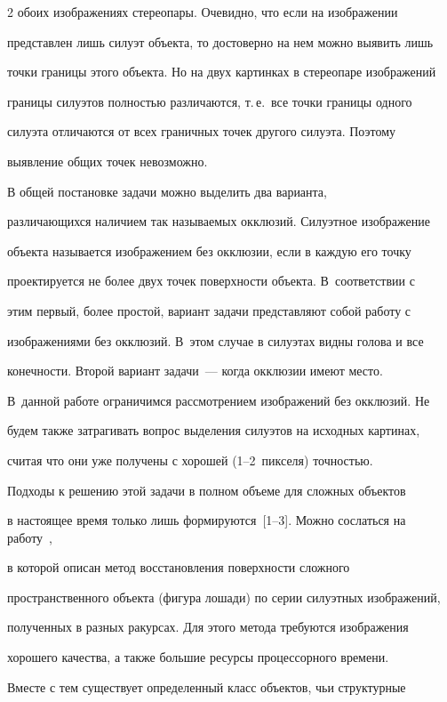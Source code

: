\begin{multicols}{2}
обоих изображениях стереопары. Очевидно, что если на изображении 

пред\-став\-лен лишь силуэт объекта, то достоверно на нем можно выявить лишь 

точки границы этого объекта. Но на двух картинках в стереопаре изображений 

границы силуэтов полностью различаются, т.\,е.\ все точки границы одного 

силуэта отличаются от всех граничных точек другого силуэта. Поэтому 

выявление общих точек невозможно.

     

     В общей постановке задачи можно выделить два варианта, 

различающихся наличием так называемых окклюзий. Силуэтное изображение 

объекта называется изображением без окклюзии, если в каждую его точку 

проектируется не более двух точек поверхности объекта. В~соответствии с 

этим первый, более простой, вариант задачи представляют собой работу с 

изображениями без окклюзий. В~этом случае в силуэтах видны голова и все 

конечности. Второй вариант задачи~--- когда окклюзии имеют место. 

В~данной работе ограничимся рассмотрением изображений без окклюзий. Не 

будем также затрагивать вопрос выделения силуэтов на исходных картинах, 

считая что они уже получены с хорошей (1--2~пикселя) точностью.

     

     Подходы к решению этой задачи в полном объеме для сложных объектов 

в настоящее время только лишь формируются~[1--3]. Можно сослаться на работу~\cite{1ts}, 

в которой описан метод восстановления поверхности сложного 

пространственного объекта (фигура лошади) по серии силуэтных изображений, 

полученных в разных ракурсах. Для этого метода требуются изображения 

хорошего качества, а также большие ресурсы процессорного времени.

     

     Вместе с тем существует определенный класс объектов, чьи структурные 


\end{multicols}

